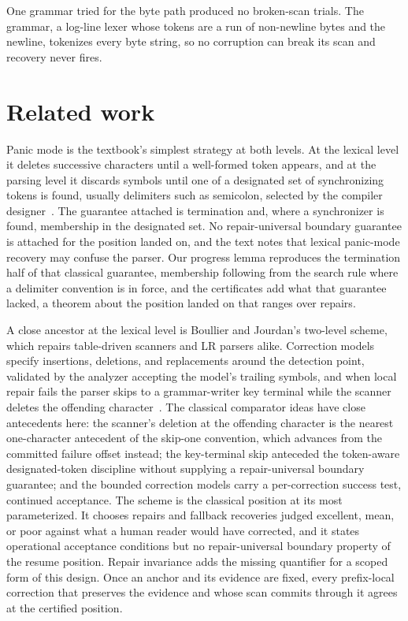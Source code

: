 \documentclass[11pt,a4paper]{article}
\theoremstyle{definition}
\theoremstyle{plain}
\theoremstyle{remark}
\begin{document}
One grammar tried for the byte path produced no broken-scan trials. The grammar, a log-line lexer whose tokens are a run
of non-newline bytes and the newline, tokenizes every byte string, so no corruption can break its scan and recovery
never fires.

\section{Related work}


Panic mode is the textbook's simplest strategy at both levels. At the lexical level it deletes successive characters
until a well-formed token appears, and at the parsing level it discards symbols until one of a designated set of
synchronizing tokens is found, usually delimiters such as semicolon, selected by the compiler designer~\citep[pp.~88,
164--165]{dragon1986}. The guarantee attached is termination and, where a synchronizer is found, membership in the
designated set. No repair-universal boundary guarantee is attached for the position landed on, and the text notes that
lexical panic-mode recovery may confuse the parser. Our progress lemma reproduces the termination half of that classical
guarantee, membership following from the search rule where a delimiter convention is in force, and the certificates add
what that guarantee lacked, a theorem about the position landed on that ranges over repairs.

A close ancestor at the lexical level is Boullier and Jourdan's two-level scheme, which repairs table-driven scanners
and LR parsers alike. Correction models specify insertions, deletions, and replacements around the detection point,
validated by the analyzer accepting the model's trailing symbols, and when local repair fails the parser skips to a
grammar-writer key terminal while the scanner deletes the offending character~\citep{boullier1987repair}. The classical
comparator ideas have close antecedents here: the scanner's deletion at the offending character is the nearest
one-character antecedent of the skip-one convention, which advances from the committed failure offset instead; the
key-terminal skip anteceded the token-aware designated-token discipline without supplying a repair-universal boundary
guarantee; and the bounded correction models carry a per-correction success test, continued acceptance. The scheme is
the classical position at its most parameterized. It chooses repairs and fallback recoveries judged excellent, mean, or
poor against what a human reader would have corrected, and it states operational acceptance conditions but no
repair-universal boundary property of the resume position. Repair invariance adds the missing quantifier for a scoped
form of this design. Once an anchor and its evidence are fixed, every prefix-local correction that preserves the
evidence and whose scan commits through it agrees at the certified position.
\end{document}
